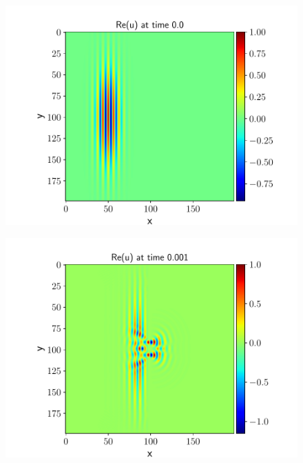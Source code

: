 \documentclass[english,notitlepage,reprint,nofootinbib]{revtex4-2}  %
\begin{document}
	\begin{figure}[h!]
		\centering
		\includegraphics[scale=0.55]{figures/real_plot_0.0.pdf}
		\caption{}
		\label{fig:prob8_Re0}
	\end{figure}

	\begin{figure}[h!]
		\centering
		\includegraphics[scale=0.55]{figures/real_plot_0.001.pdf}
		\caption{}
		\label{fig:prob8_Re1}
	\end{figure}
\end{document}
